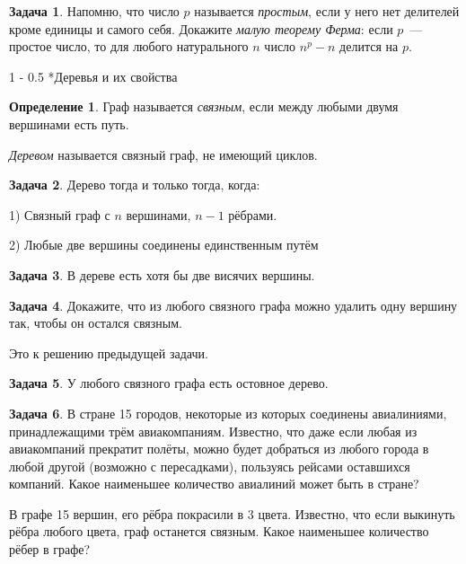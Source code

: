 \documentclass{article}
\makeatletter
\theoremstyle{definition}
\newtheorem{problem}{Задача}
\newtheorem*{definition}{Определение}
\renewcommand{\section}{\@startsection
{section}%
{1}%
{\z@}%
{-\baselineskip}%
{0.5\baselineskip}%
{\centering\large\scshape}} %
\makeatother
\begin{document}
\begin{problem}
	Напомню, что число \( p \) называется \textit{простым}, если у него нет 
	делителей кроме единицы и самого себя. Докажите \textit{малую теорему 
	Ферма}: если \( p \)~--- простое число, то для любого натурального \( n \) 
	число \( n^p - n \) делится на \( p 
	\).
\end{problem}

\section*{Деревья и их свойства}

\begin{definition}
	Граф называется \textit{связным}, если между любыми двумя вершинами есть 
	путь.
	
	\textit{Деревом} называется связный граф, не имеющий циклов.
\end{definition}

\begin{problem}
	Дерево тогда и только тогда, когда:
	
	1) Связный граф с \( n \) вершинами, \( n-1 \) рёбрами.
	
	2) Любые две вершины соединены единственным путём
	
\end{problem}

\begin{problem}
	В дереве есть хотя бы две висячих вершины.
\end{problem}

\begin{problem}
	Докажите, что из любого связного графа можно удалить одну вершину так, 
	чтобы он 
	остался связным.
\end{problem}

Это к решению предыдущей задачи.
\begin{problem}
	У любого связного графа есть остовное дерево.
\end{problem}


%

\begin{problem}
	В стране 15 городов, некоторые из которых соединены авиалиниями, 
	принадлежащими 
	трём авиакомпаниям. Известно, что даже если любая из авиакомпаний прекратит 
	полёты, можно будет добраться из любого города в любой другой (возможно с 
	пересадками), пользуясь рейсами оставшихся компаний. Какое наименьшее 
	количество авиалиний может быть в стране?
	
	В графе 15 вершин, его рёбра покрасили в 3 цвета. Известно, что если 
	выкинуть 
	рёбра любого цвета, граф останется связным. Какое наименьшее количество 
	рёбер в 
	графе?
\end{problem}
\end{document}
